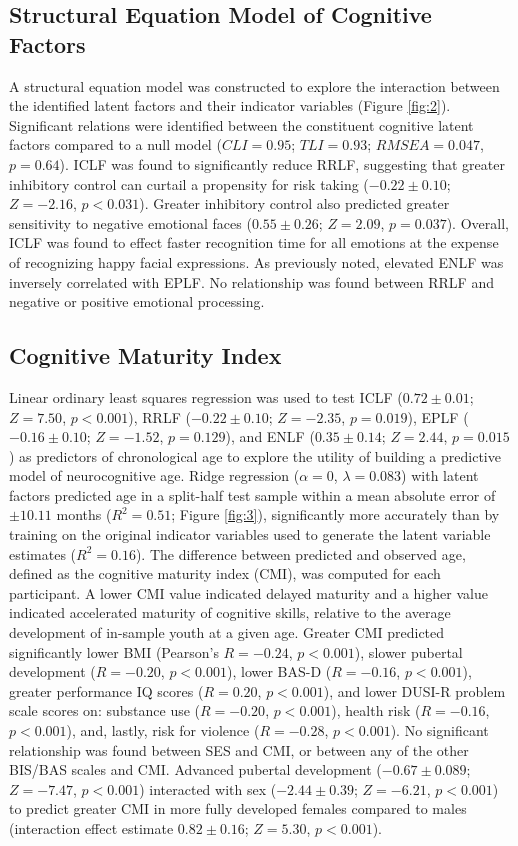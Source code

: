 \documentclass[utf8]{frontiersSCNS} %
\begin{document}
\subsection{Structural Equation Model of Cognitive Factors} A structural equation model was constructed to explore the interaction between the identified latent factors and their indicator variables (Figure \ref{fig:2}). Significant relations were identified between the constituent cognitive latent factors compared to a null model ($CLI = 0.95$; $TLI = 0.93$; $RMSEA = 0.047$, $p = 0.64$). ICLF was found to significantly reduce RRLF, suggesting that greater inhibitory control can curtail a propensity for risk taking ($-0.22\pm0.10$; $Z=-2.16$, $p<0.031$). Greater inhibitory control also predicted greater sensitivity to negative emotional faces ($0.55\pm0.26$; $Z=2.09$, $p = 0.037$). Overall, ICLF was found to effect faster recognition time for all emotions at the expense of recognizing happy facial expressions. As previously noted, elevated ENLF was inversely correlated with EPLF. No relationship was found between RRLF and negative or positive emotional processing.
\subsection{Cognitive Maturity Index} Linear ordinary least squares regression was used to test ICLF ($0.72\pm0.01$; $Z=7.50$, $p<0.001$), RRLF ($-0.22\pm0.10$; $Z=-2.35$, $p = 0.019$), EPLF ($-0.16\pm0.10$; $Z=-1.52$, $p=0.129$), and ENLF ($0.35\pm0.14$; $Z=2.44$, $p=0.015$) as predictors of chronological age to explore the utility of building a predictive model of neurocognitive age. Ridge regression ($\alpha = 0$, $\lambda = 0.083$) with latent factors predicted age in a split-half test sample within a mean absolute error of $\pm 10.11$ months ($R^2=0.51$; Figure \ref{fig:3}), significantly more accurately than by training on the original indicator variables used to generate the latent variable estimates ($R^2=0.16$). The difference between predicted and observed age, defined as the cognitive maturity index (CMI), was computed for each participant. A lower CMI value indicated delayed maturity and a higher value indicated accelerated maturity of cognitive skills, relative to the average development of in-sample youth at a given age. Greater CMI predicted significantly lower BMI (Pearson's $R=-0.24$, $p<0.001$), slower pubertal development ($R=-0.20$, $p<0.001$), lower BAS-D ($R=-0.16$, $p<0.001$), greater performance IQ scores ($R=0.20$, $p<0.001$), and lower DUSI-R problem scale scores on: substance use ($R=-0.20$, $p<0.001$), health risk ($R=-0.16$, $p<0.001$), and, lastly, risk for violence ($R=-0.28$, $p<0.001$). No significant relationship was found between SES and CMI, or between any of the other BIS/BAS scales and CMI. Advanced pubertal development ($-0.67\pm0.089$; $Z=-7.47$, $p<0.001$) interacted with sex ($-2.44\pm0.39$; $Z=-6.21$, $p<0.001$) to predict greater CMI in more fully developed females compared to males (interaction effect estimate $0.82\pm0.16$; $Z=5.30$, $p<0.001$).
%
\end{document}

